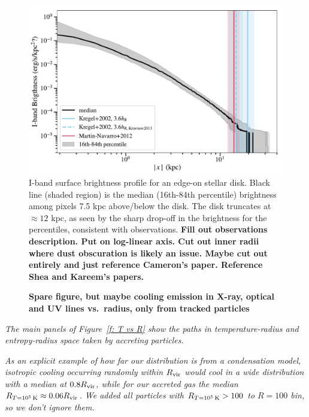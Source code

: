 \documentclass[fleqn,usenatbib]{mnras}
\newcommand{\Rcon}{R_{T=10^5\,{\rm K}}}
\begin{document}
\begin{figure}
\centering
\includegraphics[width=\columnwidth]{figures/brightness_profile.pdf}
\caption{
I-band surface brightness profile for an edge-on stellar disk.
Black line (shaded region) is the median (16th-84th percentile) brightness among pixels 7.5 kpc above/below the disk.
The disk truncates at $\approx 12$ kpc, as seen by the sharp drop-off in the brightness for the percentiles, consistent with observations.
\textbf{
Fill out observations description.
Put on log-linear axis.
Cut out inner radii where dust obscuration is likely an issue.
Maybe cut out entirely and just reference Cameron's paper.
Reference Shea and Kareem's papers.
}
}
\label{f:stellar_profile}
\end{figure}

\begin{figure}
    \centering
    \caption{
    \textbf{Spare figure, but maybe
    cooling emission in X-ray, optical and UV lines vs.\ radius, only from tracked particles
    }
    }
    \label{f:emission}
\end{figure}

\textit{
The main panels of Figure~\ref{f: T vs R} show the paths in temperature-radius and entropy-radius space taken by accreting particles.
}

\textit{
As an explicit example of how far our distribution is from a condensation model, isotropic cooling occurring randomly within $R_{\rm vir}$ would cool in a wide distribution with a median at $0.8 R_{\rm vir}$, while for our accreted gas the median $\Rcon \approx 0.06 R_{\rm vir}$.
}
\textit{We added all particles with $\Rcon>100$ to $R=100$ bin, so we don't ignore them.}
\end{document}
